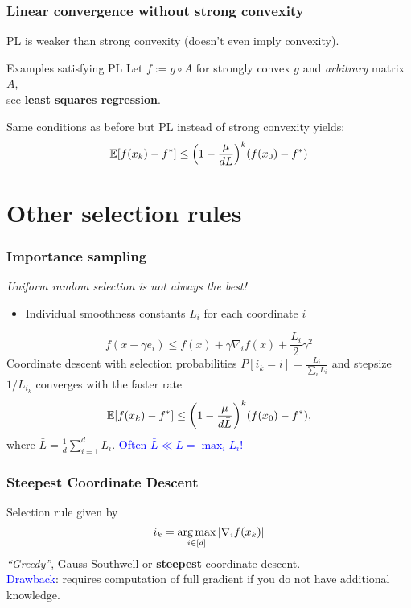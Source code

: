 \documentclass[aspectratio=149]{beamer}
\begin{document}
\begin{frame}
  \frametitle{Linear convergence without strong convexity}
  PL is weaker than strong convexity (doesn't even imply convexity).
  \begin{block}{Examples satisfying PL}
    Let $f := g\circ A$ for strongly convex $g$ and \emph{arbitrary} matrix $A$, \\
    see \textbf{least squares regression}.
  \end{block}

  \begin{corollary}%
    Same conditions as before but PL instead of strong convexity yields:
    \begin{equation}
      \mathbb{E} [f(x_k)- f^*] \le {\left(1 - \frac{\mu}{d L}\right)}^k (f(x_0)-f^*)
    \end{equation}
  \end{corollary}
\end{frame}


\section{Other selection rules}%
\label{sec:}

\begin{frame}
  \frametitle{Importance sampling}
  \begin{center}
    \textit{Uniform random selection is not always the best!}
  \end{center}
  \begin{itemize}
    \item Individual smoothness constants $L_i$ for each coordinate $i$
  \end{itemize}
  \begin{equation}
    f(x+ \gamma e_i) \le f(x) + \gamma \nabla_i f(x) + \frac{L_i}{2} \gamma^2
  \end{equation}
  Coordinate descent with selection probabilities $P[i_k=i] = \frac{L_i}{\sum_i L_i}$ and stepsize
  $1/L_{i_k}$ converges with the faster rate
  \begin{equation}
      \mathbb{E} [f(x_k)- f^*] \le {\left(1 - \frac{\mu}{d \bar{L}}\right)}^k (f(x_0)-f^*),
  \end{equation}
  where $\bar{L}= \frac{1}{d} \sum_{i=1}^{d}L_i$. \hfill \textcolor{blue}{Often $\bar{L} \ll L = \max_i L_i$!}
\end{frame}


\begin{frame}
  \frametitle{Steepest Coordinate Descent}
  Selection rule given by
  \begin{equation}
    i_k = \operatorname*{arg\,max}_{i\in [d]} \vert \nabla_i f(x_k) \vert
  \end{equation}
  \emph{``Greedy''}, Gauss-Southwell or \textbf{steepest} coordinate descent.\\
  \textcolor{blue}{Drawback}: requires computation of full gradient if you do not have additional knowledge.
\end{frame}
\end{document}
